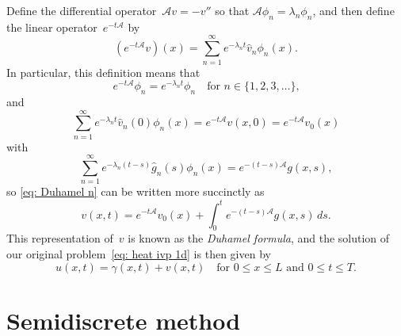 Define the differential operator~$\mathcal{A}v=-v''$ so that 
$\mathcal{A}\phi_n=\lambda_n\phi_n$, and then define the linear 
operator~$e^{-t\mathcal{A}}$ by
\[
(e^{-t\mathcal{A}}v)(x)=\sum_{n=1}^\infty e^{-\lambda_nt}\hat v_n\phi_n(x).
\]
In particular, this definition means that
\[
e^{-t\mathcal{A}}\phi_n=e^{-\lambda_nt}\phi_n
	\quad\text{for $n\in\{1,2,3,\ldots\}$,}
\]
and
\[
\sum_{n=1}^\infty e^{-\lambda_nt}\hat v_n(0)\phi_n(x)
	=e^{-t\mathcal{A}}v(x,0)=e^{-t\mathcal{A}}v_0(x)
\]
with
\[
\sum_{n=1}^\infty e^{-\lambda_n(t-s)}\hat g_n(s)\phi_n(x)
	=e^{-(t-s)\mathcal{A}}g(x,s),
\]
so \eqref{eq: Duhamel n} can be written more succinctly as
\[
v(x,t)=e^{-t\mathcal{A}}v_0(x)+\int_0^te^{-(t-s)\mathcal{A}}g(x,s)\,ds.
\]
This representation of~$v$ is known as the \emph{Duhamel formula}, and the 
solution of our original problem~\eqref{eq: heat ivp 1d} is then given by
\[
u(x,t)=\gamma(x,t)+v(x,t)\quad\text{for $0\le x\le L$ and $0\le t\le T$.}
\]

\section{Semidiscrete method}

